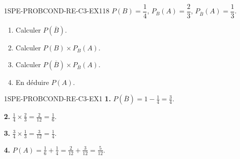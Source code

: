 

\begin{exercice}{1SPE-PROBCOND-RE-C3-EX1}{1}{8}
$P(B) = \dfrac{1}{4}$, $P_B(A) = \dfrac{2}{3}$, $P_{\overline{B}}(A) = \dfrac{1}{3}$.

\begin{enumerate}
  \item Calculer $P(\overline{B})$.
  \item Calculer $P(B) \times P_B(A)$.
  \item Calculer $P(\overline{B}) \times P_{\overline{B}}(A)$.
  \item En déduire $P(A)$.
\end{enumerate}
\end{exercice}


\begin{corrige}{1SPE-PROBCOND-RE-C3-EX1}
\textbf{1.} $P(\overline{B}) = 1 - \frac{1}{4} = \frac{3}{4}$.

\textbf{2.} $\frac{1}{4} \times \frac{2}{3} = \frac{2}{12} = \frac{1}{6}$.

\textbf{3.} $\frac{3}{4} \times \frac{1}{3} = \frac{3}{12} = \frac{1}{4}$.

\textbf{4.} $P(A) = \frac{1}{6} + \frac{1}{4} = \frac{2}{12} + \frac{3}{12} = \frac{5}{12}$.
\end{corrige}
